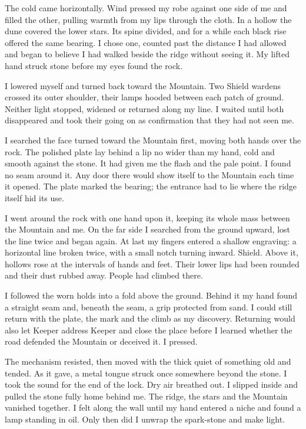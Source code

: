 The cold came horizontally. Wind pressed my robe against one side of me and filled the other, pulling warmth from my lips through the cloth. In a hollow the dune covered the lower stars. Its spine divided, and for a while each black rise offered the same bearing. I chose one, counted past the distance I had allowed and began to believe I had walked beside the ridge without seeing it. My lifted hand struck stone before my eyes found the rock.\par

I lowered myself and turned back toward the Mountain. Two Shield wardens crossed its outer shoulder, their lamps hooded between each patch of ground. Neither light stopped, widened or returned along my line. I waited until both disappeared and took their going on as confirmation that they had not seen me.\par

I searched the face turned toward the Mountain first, moving both hands over the rock. The polished plate lay behind a lip no wider than my hand, cold and smooth against the stone. It had given me the flash and the pale point. I found no seam around it. Any door there would show itself to the Mountain each time it opened. The plate marked the bearing; the entrance had to lie where the ridge itself hid its use.\par

I went around the rock with one hand upon it, keeping its whole mass between the Mountain and me. On the far side I searched from the ground upward, lost the line twice and began again. At last my fingers entered a shallow engraving: a horizontal line broken twice, with a small notch turning inward. Shield. Above it, hollows rose at the intervals of hands and feet. Their lower lips had been rounded and their dust rubbed away. People had climbed there.\par

I followed the worn holds into a fold above the ground. Behind it my hand found a straight seam and, beneath the seam, a grip protected from sand. I could still return with the plate, the mark and the climb as my discovery. Returning would also let Keeper address Keeper and close the place before I learned whether the road defended the Mountain or deceived it. I pressed.\par

The mechanism resisted, then moved with the thick quiet of something old and tended. As it gave, a metal tongue struck once somewhere beyond the stone. I took the sound for the end of the lock. Dry air breathed out. I slipped inside and pulled the stone fully home behind me. The ridge, the stars and the Mountain vanished together. I felt along the wall until my hand entered a niche and found a lamp standing in oil. Only then did I unwrap the spark-stone and make light.\par

